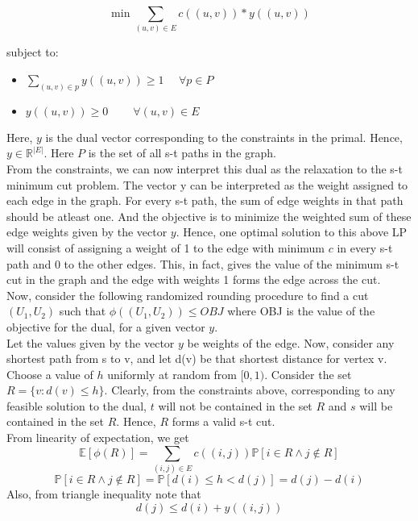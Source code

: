 \documentclass[BTech]{iitmdiss}
\begin{document}
	  $$\min \displaystyle\sum_{(u,v) \in E} c((u,v)) \ast y((u,v))$$
	  
	  subject to:
	  \begin{itemize}
	   \item 
	    $\displaystyle \sum_{(u,v) \in p} y((u,v)) \geq 1~~~~~~\forall p \in P$
	   \item
	    $y((u,v)) \geq 0 ~~~~~~~~~~ \forall (u,v) \in E$
	   
	  \end{itemize}

	  Here, $y$ is the dual vector corresponding to the constraints in the primal. Hence, $y \in \mathbb{R}^{|E|}$. Here $P$ is the set of all
	  s-t paths in the graph. \\
	  
	  From the constraints, we can now interpret this dual as the relaxation to the s-t minimum cut problem. The vector y can be interpreted 
	  as the weight assigned to each edge in the graph. For every s-t path, the sum of edge weights in that path should be atleast one. And the 
	  objective is to minimize the weighted sum of these edge weights given by the vector $y$. Hence, one optimal solution to this above LP
	  will consist of assigning a weight of 1 to the edge with minimum $c$ in every s-t path and 0 to the other edges. This, in fact, gives the 
	  value of the minimum s-t cut in the graph and the edge with weights 1 forms the edge across the cut. \\
	  
	  Now, consider the following randomized rounding procedure to find a cut $(U_1, U_2)$ such that $\phi((U_1, U_2)) \leq OBJ$ where OBJ is 
	  the value of the objective for the dual, for a given vector $y$. \\
	  
	  Let the values given by the vector $y$ be weights of the edge. Now, consider any shortest path from s to v, and let d(v) be that 
	  shortest distance for vertex v. Choose a value of $h$ uniformly at random from $[0,1)$. Consider the set 
	  $R = \{v:d(v) \leq h\}$. Clearly, from the constraints above, corresponding to any feasible solution to the dual, $t$ will not be contained 
	  in the set $R$ and $s$ will be contained in the set $R$. Hence, $R$ forms a valid s-t cut. \\
	  
	  From linearity of expectation, we get
	  $$\mathbb{E}[\phi(R)] = \displaystyle\sum_{(i,j) \in E} c((i,j)) \mathbb{P}[i \in R \wedge j \notin R]$$
	  $$\mathbb{P}[i \in R \wedge j \notin R] = \mathbb{P}[d(i) \leq h < d(j)] = d(j)-d(i)$$
	  Also, from triangle inequality note that 
	  $$d(j) \leq d(i) + y((i,j))$$
	  
\end{document}

